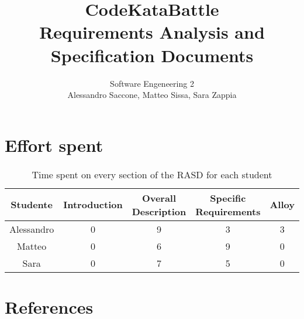 \documentclass[12pt,a4paper]{article}
\title{CodeKataBattle\\ Requirements Analysis and Specification Documents}
\author{Software Engeneering 2\\
       Alessandro Saccone, Matteo Sissa, Sara Zappia}
\begin{document}
\maketitle

\newpage









\section{Effort spent}
\begin{table}[h]
  \centering
  \begin{tabular}{|c|c|c|c|c|}
    \hline
     Studente & Introduction & Overall Description & Specific Requirements & Alloy \\
    \hline
    Alessandro & 0 & 9 & 3 & 3 \\
    \hline
    Matteo & 0 & 6 & 9 & 0 \\
    \hline
    Sara & 0 & 7 & 5 & 0 \\
    \hline
  \end{tabular}
  \caption{Time spent on every section of the RASD for each student}
  \label{tab:effort}
\end{table}

\section{References}


\end{document}
